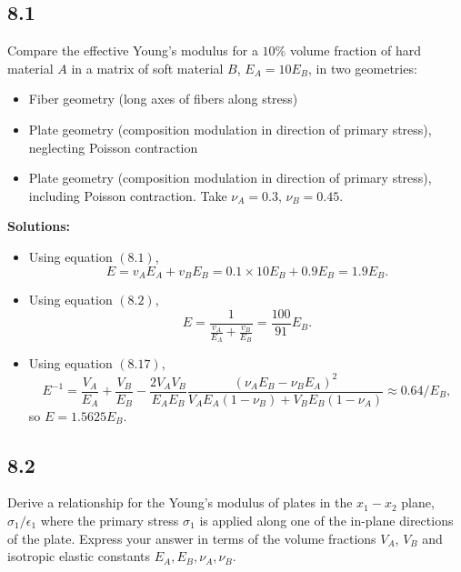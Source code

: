 \documentclass[12pt]{article}
\begin{document}
\subsection{8.1}
Compare the effective Young's modulus for a $10\%$ volume fraction of hard material $A$ in a matrix of soft material $B$, $E_A=10 E_B$, in two geometries:
\begin{itemize}
  \item Fiber geometry (long axes of fibers along stress)
  \item Plate geometry (composition modulation in direction of primary stress), neglecting Poisson contraction
  \item Plate geometry (composition modulation in direction of primary stress), including Poisson contraction. Take $\nu_A= 0.3$, $\nu_B= 0.45$.
\end{itemize}

\textbf{Solutions:}
\begin{itemize}
  \item Using equation $(8.1)$,
        \begin{equation}
          E = v_A E_A + v_B E_B = 0.1 \times 10 E_B + 0.9 E_B = 1.9 E_B.
        \end{equation}

  \item Using equation $(8.2)$,
        \begin{equation}
          E = \frac{ 1 }{ \frac{ v_A }{ E_A } + \frac{ v_B }{ E_B } }
          = \frac{ 100 }{ 91 } E_B.
        \end{equation}

  \item Using equation $(8.17)$,
        \begin{equation}
          E^{-1} = \frac{V_A}{E_A}+\frac{V_B}{E_B}- \frac{2 V_A V_B}{E_A E_B}\frac{\left(\nu_A E_B-\nu_B E_A\right)^2}{V_A E_A\left(1- \nu_B\right)+ V_B E_B\left(1 - \nu_A\right)}
          \approx 0.64 / E_B,
        \end{equation}
        so $E = 1.5625 E_B$.
\end{itemize}

\subsection{8.2}
Derive a relationship for the Young's modulus of plates in the $x_1 - x_2$ plane,
$\sigma_1/\epsilon_1$ where the primary stress $\sigma_1$ is applied along one of
the in-plane directions of the plate. Express your answer in terms of the volume
fractions $V_A$, $V_B$ and isotropic elastic constants $E_A, E_B, \nu_A, \nu_B$.
\end{document}
